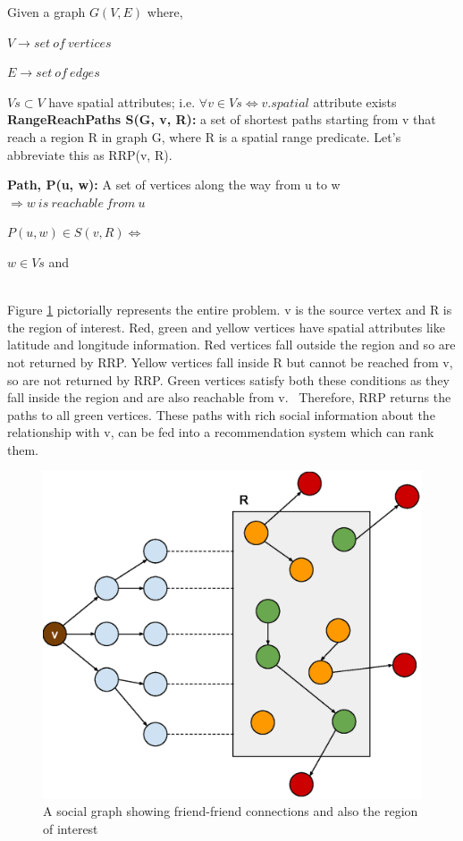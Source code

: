 Given a graph $G(V, E)$ where,

\quad$V \rightarrow set\ of\ vertices$

\quad$E \rightarrow set\ of\ edges$

$Vs \subset V$ have spatial attributes; i.e. $\forall v \in Vs \Leftrightarrow v.spatial$ attribute exists\\

\textbf{RangeReachPaths S(G, v, R):} a set of shortest paths starting from v that reach a region R in graph G, where R is a spatial range predicate. Let's abbreviate this as RRP(v, R).

\textbf{Path, P(u, w):} A set of vertices along the way from u to w \(\Rightarrow w\ is\ reachable\ from\ u\)

\quad${P(u, w) \in S(v, R) \Leftrightarrow}$

\quad{}

\quad\quad${w \in Vs}$ and

\quad{}\\

Figure \ref{fig:socio-spatial-graph} pictorially represents the entire problem. v is the source vertex and R is the region of interest. Red, green and yellow vertices have spatial attributes like latitude and longitude information. Red vertices fall outside the region and so are not returned by RRP. Yellow vertices fall inside R but cannot be reached from v, so are not returned by RRP. Green vertices satisfy both these conditions as they fall inside the region and are also reachable from v. ~Therefore, RRP returns the paths to all green vertices. These paths with rich social information about the relationship with v, can be fed into a recommendation system which can rank them.

\iffalse
\begin{figure}[h]
    \centering
    \includegraphics[width=0.5\linewidth]{images/image10.eps}
    \caption{A social graph showing friend-friend connections and also
the region of interest}
    \label{fig:socio-spatial-graph}
\end{figure}

